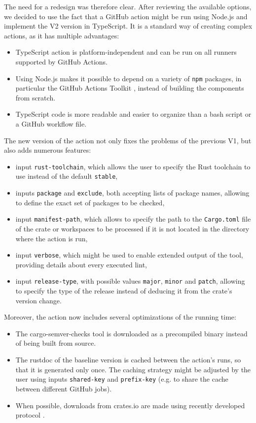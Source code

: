 \documentclass[licencjacka,en]{pracamgr}
\begin{document}
The need for a redesign was therefore clear. After reviewing the available options,
we decided to use the fact that a GitHub action might
be run using Node.js and implement the V2 version in TypeScript. It is a standard way
of creating complex actions, as it has multiple advantages:
\begin{itemize}
	\item TypeScript action is platform-independent and can be run on all runners supported by GitHub Actions.
	\item Using Node.js makes it possible to depend on a variety of \texttt{npm} packages, in particular the GitHub Actions
		Toolkit \cite{github_actions_toolkit}, instead of building the components from scratch.
	\item TypeScript code is more readable and easier to organize than a bash script or a GitHub workflow file.
\end{itemize}
The new version of the action not only fixes the problems of the previous V1, but also
adds numerous features:
\begin{itemize}
	\item input \texttt{rust-toolchain}, which allows the user to specify the Rust toolchain to use instead
		of the default \texttt{stable},
	\item inputs \texttt{package} and \texttt{exclude}, both accepting lists of package names,
		allowing to define the exact set of packages to be checked,
	\item input \texttt{manifest-path}, which allows to specify the path to the \texttt{Cargo.toml} file
		of the crate or workspaces to be processed if it is not located in the directory where
		the action is run,
	\item input \texttt{verbose}, which might be used to enable extended output of the tool,
		providing details about every executed lint,
	\item input \texttt{release-type}, with possible values \texttt{major}, \texttt{minor} and \texttt{patch},
		allowing to specify the type of the release instead of deducing it from the crate's version change.
\end{itemize}
Moreover, the action now includes several optimizations of the running time:
\begin{itemize}
	\item The cargo-semver-checks tool is downloaded as a precompiled binary instead of being built from source.
	\item The rustdoc of the baseline version is cached between the action's runs, so that it is generated
		only once. The caching strategy might be adjusted by the user using inputs \texttt{shared-key}
		and \texttt{prefix-key} (e.g. to share the cache between different GitHub jobs).
	\item When possible, downloads from crates.io are made using recently developed  protocol
		\cite{crates_io_sparse_protocol}.
\end{itemize}
\end{document}
